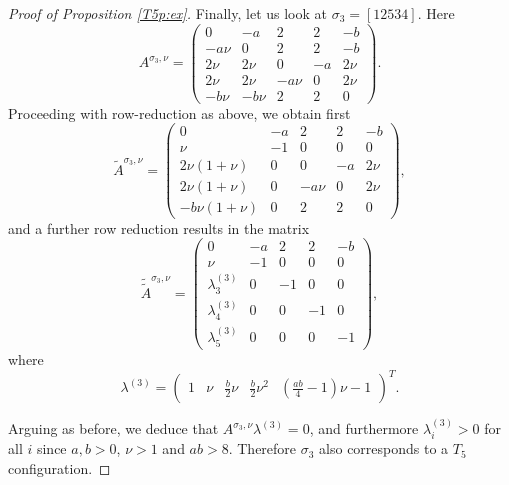 \documentclass[10pt,a4paper]{amsart}
\begin{document}
\begin{proof}[Proof of Proposition \ref{T5p:ex}]
Finally, let us look at $\sigma_3=[1 2 5 3 4]$. Here
$$
A^{\sigma_3,\nu}=\begin{pmatrix}
	0&-a&2&2&-b\\ -a\nu &0&2&2&-b \\ 2\nu &2\nu &0&-a&2\nu\\ 2\nu &2\nu &-a\nu &0&2\nu\\-b\nu &-b\nu &2 &2 &0
\end{pmatrix}.	
$$ 
Proceeding with row-reduction as above, we obtain first
$$
\tilde A^{\sigma_3,\nu}=\begin{pmatrix}
	0&-a&2&2&-b\\ 
	\nu &-1&0&0&0\\ 
	2\nu(1+\nu) &0&0&-a&2\nu\\ 
	2\nu(1+\nu) &0&-a\nu &0&2\nu\\
	-b\nu(1+\nu) &0 &2 &2 &0
\end{pmatrix},
$$ 
and a further row reduction results in the matrix
$$
  \tilde{\tilde A}^{\sigma_3, \nu} 
=
\begin{pmatrix}   	0&-a&2&2&-b\\ 
	\nu &-1&0&0&0\\ 
	\lambda^{(3)}_3 &0&-1&0&0\\ 
	\lambda^{(3)}_4 &0&0&-1&0\\
	\lambda^{(3)}_5 &0 &0&0&-1
\end{pmatrix},
$$ 
where
$$
\lambda^{(3)}=\begin{pmatrix}1&\nu &\tfrac{b}{2}\nu &\tfrac{b}{2}\nu^2&\left(\frac{ab}{4}-1\right)\nu-1\end{pmatrix}^T.
$$

Arguing as before, we deduce that $A^{\sigma_3,\nu}\lambda^{(3)}=0$, and furthermore $\lambda^{(3)}_i>0$ for all $i$ since $a,b>0$, $\nu>1$ and $ab>8$. Therefore $\sigma_3$ also corresponds to a $T_5$ configuration.

\bigskip







\end{proof}
\end{document}
